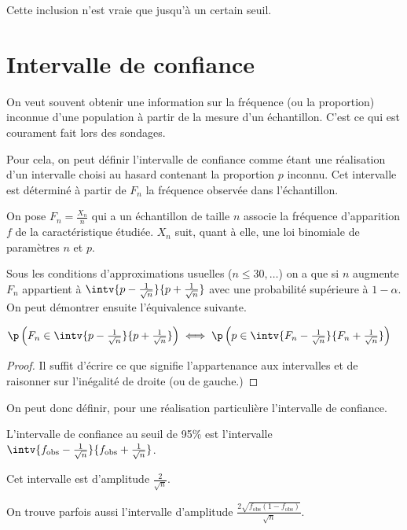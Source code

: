 \documentclass[12pt,a4paper,french]{article}
\begin{document}
\begin{remarque}
  Cette inclusion n'est vraie que jusqu'à un certain seuil.
\end{remarque}

\section{Intervalle de confiance}

On veut souvent obtenir une information sur la fréquence (ou la
proportion) inconnue d'une population à partir de la mesure d'un
échantillon. C'est ce qui est courament fait lors des sondages.

Pour cela, on peut définir l'intervalle de confiance comme étant une
réalisation d'un intervalle choisi au hasard contenant la proportion $p$
inconnu. Cet intervalle est déterminé à partir de $F_n$ la fréquence
observée dans l'échantillon.

On pose $F_n = \frac{X_n}{n}$ qui a un échantillon de taille $n$ associe
la fréquence d'apparition $f$ de la caractéristique étudiée. $X_n$ suit,
quant à elle, une loi binomiale de paramètres $n$ et $p$.

Sous les conditions d'approximations usuelles ($n \leqslant 30, \dots$)
on a que si $n$ augmente $F_n$ appartient à $\intv{p -
\frac1{\sqrt{n}}}{p + \frac1{\sqrt{n}}}$ avec une probabilité supérieure
à $1 - \alpha$. On peut démontrer ensuite l'équivalence suivante.

\begin{proposition}
  $\p\left(F_n \in \intv{p - \frac1{\sqrt{n}}}{p +
  \frac1{\sqrt{n}}}\right) \iff \p\left(p \in \intv{F_n -
\frac1{\sqrt{n}}}{F_n + \frac1{\sqrt{n}}}\right)$
  \begin{proof}
    Il suffit d'écrire ce que signifie l'appartenance aux intervalles et
    de raisonner sur l'inégalité de droite (ou de gauche.)
  \end{proof}
\end{proposition}

On peut donc définir, pour une réalisation particulière l'intervalle de
confiance.

\begin{definition}
  L'intervalle de confiance au seuil de 95\% est l'intervalle
  $\intv{f_{\text{obs}} - \frac1{\sqrt{n}}}{f_{\text{obs}} +
  \frac1{\sqrt{n}}}$.
\end{definition}

Cet intervalle est d'amplitude $\frac2{\sqrt{n}}$.

\begin{remarque}
  On trouve parfois aussi l'intervalle d'amplitude
  $\frac{2\sqrt{f_{\text{obs}}(1-f_{\text{obs}})}}{\sqrt{n}}$.
\end{remarque}
\end{document}
